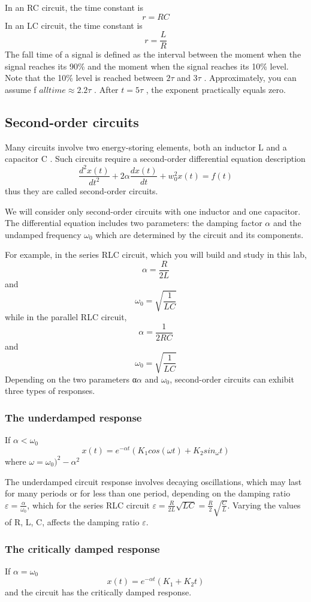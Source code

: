 \documentclass{article}
\begin{document}
In an RC circuit, the time constant is
$$r=RC$$
In an LC circuit, the time constant is
$$r=\frac{L}{R}$$
The fall time of a signal is defined as the interval between the moment when
the signal reaches its 90\% and the moment when the signal reaches its 10\% level.
Note that the 10\% level is reached between $2\tau$ and $3\tau$ . Approximately, you can
assume f $alltime \approx 2.2\tau$ . After $t = 5\tau$ , the exponent practically equals zero.
\subsection{Second-order circuits}
Many circuits involve two energy-storing elements, both an inductor L and a
capacitor C . Such circuits require a second-order differential equation description
$$\frac{d^2x(t)}{dt^2}+2\alpha\frac{dx(t)}{dt}+w_0^2x(t)=f(t)$$
thus they are called second-order circuits.

We will consider only second-order circuits with one inductor and one capacitor. The differential equation includes two parameters: the damping factor
$\alpha$ and the undamped frequency $\omega_0$ which are determined by the circuit and its
components.

For example, in the series RLC circuit, which you will build and study in
this lab,
$$\alpha=\frac{R}{2L}$$ and $$\omega_0=\sqrt{\frac{1}{LC}}$$
while in the parallel RLC circuit,
$$\alpha=\frac{1}{2RC}$$ and $$\omega_0=\sqrt{\frac{1}{LC}}$$
Depending on the two parameters α$\alpha$ and $\omega_0$, second-order circuits can
exhibit three types of responses.
\subsubsection{The underdamped response}
If $\alpha <\omega_0$
$$x(t)=e^{-\alpha t}(K_1cos(\omega t)+K_2sin_\omega t)$$
where $\omega=\omega_0)^2-\alpha^2$

The underdamped circuit response involves decaying oscillations, which
may last for many periods or for less than one period, depending on the
damping ratio $\varepsilon=\frac{\alpha}{\omega_0}$, which for the series RLC circuit $\varepsilon=\frac{R}{2L}\sqrt{LC}=\frac{R}{2}\sqrt{\frac{C}{L}}$. Varying the values of R, L, C, affects the damping ratio $\varepsilon$.
\subsubsection{The critically damped response}
If $\alpha=\omega_0$
$$x(t)=e^{-\alpha t}(K_1+K_2t)$$
and the circuit has the critically damped response.
\end{document}
